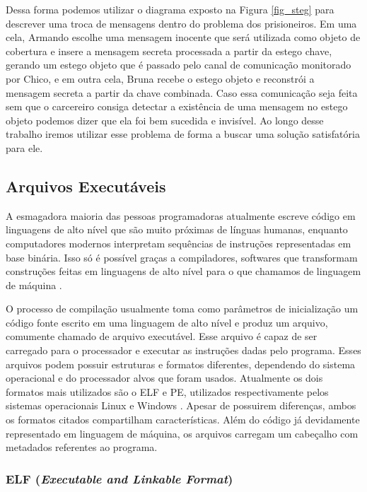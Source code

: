  Dessa forma podemos utilizar o diagrama exposto na Figura \ref{fig_steg} para descrever uma troca de mensagens dentro do problema dos prisioneiros. Em uma cela, Armando escolhe uma mensagem inocente que será utilizada como objeto de cobertura e insere a mensagem secreta processada a partir da estego chave, gerando um estego objeto que é passado pelo canal de comunicação monitorado por Chico, e em outra cela, Bruna recebe o estego objeto e reconstrói a mensagem secreta a partir da chave combinada. Caso essa comunicação seja feita sem que o carcereiro consiga detectar a existência de uma mensagem no estego objeto podemos dizer que ela foi bem sucedida e invisível. Ao longo desse trabalho iremos utilizar esse problema de forma a buscar uma solução satisfatória para ele. 

\subsection{Arquivos Executáveis}

A esmagadora maioria das pessoas programadoras atualmente escreve código em linguagens de alto nível que são muito próximas de línguas humanas, enquanto computadores modernos interpretam sequências de instruções representadas em base binária. Isso só é possível graças a compiladores, softwares que transformam construções feitas em linguagens de alto nível para o que chamamos de linguagem de máquina \cite{patterson}.

O processo de compilação usualmente toma como parâmetros de inicialização um código fonte escrito em uma linguagem de alto nível e produz um arquivo, comumente chamado de arquivo executável. Esse arquivo é capaz de ser carregado para o processador e executar as instruções dadas pelo programa. Esses arquivos podem possuir estruturas e formatos diferentes, dependendo do sistema operacional e do processador alvos que foram usados. Atualmente os dois formatos mais utilizados são o ELF e PE, utilizados respectivamente pelos sistemas operacionais Linux \cite{linuxbase_4} e Windows \cite{microsoft_pe}. Apesar de possuirem diferenças, ambos os formatos citados compartilham características. Além do código já devidamente representado em linguagem de máquina, os arquivos carregam um cabeçalho com metadados referentes ao programa.

\subsubsection{ELF (\textit{Executable and Linkable Format})}

